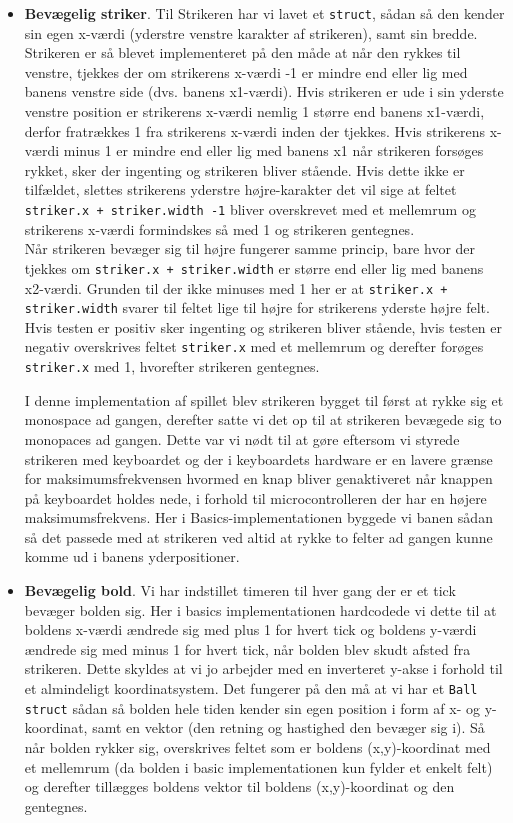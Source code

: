 \begin{itemize}
\item \textbf{Bevægelig striker}. Til Strikeren har vi lavet et \texttt{struct}, sådan så den kender sin egen x-værdi (yderstre venstre karakter af strikeren), samt sin bredde.
Strikeren er så blevet implementeret på den måde at når den rykkes til venstre, tjekkes der om strikerens x-værdi -1 er mindre end eller lig med banens venstre side (dvs. banens x1-værdi). Hvis strikeren er ude i sin yderste venstre position er strikerens x-værdi nemlig 1 større end banens x1-værdi, derfor fratrækkes 1 fra strikerens x-værdi inden der tjekkes. Hvis strikerens x-værdi minus 1 er mindre end eller lig med banens x1 når strikeren forsøges rykket, sker der ingenting og strikeren bliver stående. Hvis dette ikke er tilfældet, slettes strikerens yderstre højre-karakter det vil sige at feltet \texttt{striker.x + striker.width -1} bliver overskrevet med et mellemrum og strikerens x-værdi formindskes så med 1 og strikeren gentegnes.\\
Når strikeren bevæger sig til højre fungerer samme princip, bare hvor der tjekkes om \texttt{striker.x + striker.width} er større end eller lig med banens x2-værdi. Grunden til der ikke minuses med 1 her er at \texttt{striker.x + striker.width} svarer til feltet lige til højre for strikerens yderste højre felt. Hvis testen er positiv sker ingenting og strikeren bliver stående, hvis testen er negativ overskrives  feltet \texttt{striker.x} med et mellemrum og derefter forøges \texttt{striker.x} med 1, hvorefter strikeren gentegnes.

I denne implementation af spillet blev strikeren bygget til først at rykke sig et monospace ad gangen, derefter satte vi det op til at strikeren bevægede sig to monopaces ad gangen. Dette var vi nødt til at gøre eftersom vi styrede strikeren med keyboardet og der i keyboardets hardware er en lavere grænse for maksimumsfrekvensen hvormed en knap bliver genaktiveret når knappen på keyboardet holdes nede, i forhold til microcontrolleren der har en højere maksimumsfrekvens. Her i Basics-implementationen byggede vi banen sådan så det passede med at strikeren ved altid at rykke to felter ad gangen kunne komme ud i banens yderpositioner.

\item \textbf{Bevægelig bold}. Vi har indstillet timeren til hver gang der er et tick bevæger bolden sig. Her i basics implementationen hardcodede vi dette til at boldens x-værdi ændrede sig med plus 1 for hvert tick og boldens y-værdi ændrede sig med minus 1 for hvert tick, når bolden blev skudt afsted fra strikeren. Dette skyldes at vi jo arbejder med en inverteret y-akse i forhold til et almindeligt koordinatsystem. Det fungerer på den må at vi har et \texttt{Ball struct} sådan så bolden hele tiden kender sin egen position i form af x- og y-koordinat, samt en vektor (den retning og hastighed den bevæger sig i). Så når bolden rykker sig, overskrives feltet som er boldens (x,y)-koordinat med et mellemrum (da bolden i basic implementationen kun fylder et enkelt felt) og derefter tillægges boldens vektor til boldens (x,y)-koordinat og den gentegnes.


\end{itemize}
